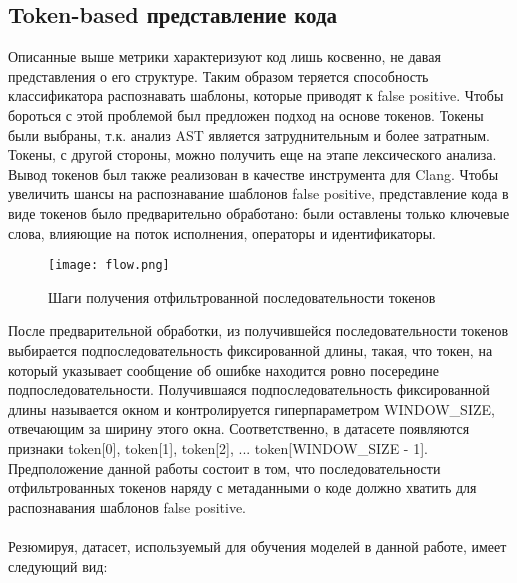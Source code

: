 \subsection{Token-based представление кода}
\label{sec:Tokens} 
Описанные выше метрики характеризуют код лишь косвенно, не давая представления о его структуре. Таким образом теряется способность классификатора распознавать шаблоны, которые приводят к false positive. Чтобы бороться с этой проблемой был предложен подход на основе токенов. Токены были выбраны, т.к. анализ AST является затруднительным и более затратным. Токены, с другой стороны, можно получить еще на этапе лексического анализа. Вывод токенов был также реализован в качестве инструмента для Clang. Чтобы увеличить шансы на распознавание шаблонов false positive, представление кода в виде токенов было предварительно обработано: были оставлены только ключевые слова, влияющие на поток исполнения, операторы и идентификаторы.

\begin{figure}[H]
    \centering
    \texttt{[image: flow.png]}
    \caption{Шаги получения отфильтрованной последовательности токенов}
\end{figure}

После предварительной обработки, из получившейся последовательности токенов выбирается подпоследовательность фиксированной длины, такая, что токен, на который указывает сообщение об ошибке находится ровно посередине подпоследовательности. Получившаяся подпоследовательность фиксированной длины называется окном и контролируется гиперпараметром WINDOW\_SIZE, отвечающим за ширину этого окна. Соответственно, в датасете появляются признаки token[0], token[1], token[2], ... token[WINDOW\_SIZE - 1]. Предположение данной работы состоит в том, что последовательности отфильтрованных токенов наряду с метаданными о коде должно хватить для распознавания шаблонов false positive.
\\
\\
Резюмируя, датасет, используемый для обучения моделей в данной работе, имеет следующий вид:

\begin{table}[H]
    \centering
    \caption{Общий вид элемента датасета}
\end{table}

